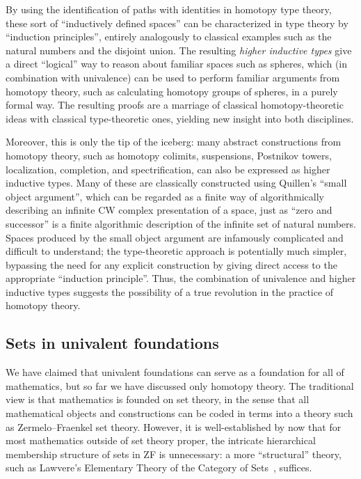 By using the identification of paths with identities in homotopy type theory, these sort of ``inductively defined spaces'' can be characterized in type theory by ``induction principles'', entirely analogously to classical examples such as the natural numbers and the disjoint union.
The resulting \emph{higher inductive types} give a direct ``logical'' way to reason about familiar spaces such as spheres, which (in combination with univalence) can be used to perform familiar arguments from homotopy theory, such as calculating homotopy groups of spheres, in a purely formal way.
The resulting proofs are a marriage of classical homotopy-theoretic ideas with classical type-theoretic ones, yielding new insight into both disciplines.

Moreover, this is only the tip of the iceberg: many abstract constructions from homotopy theory, such as homotopy colimits, suspensions, Postnikov towers, localization, completion, and spectrification, can also be expressed as higher inductive types.
Many of these are classically constructed using Quillen's ``small object argument'', which can be regarded as a finite way of algorithmically describing an infinite CW complex presentation of a space, just as ``zero and successor'' is a finite algorithmic description of the infinite set of natural numbers.
Spaces produced by the small object argument are infamously complicated and difficult to understand; the type-theoretic approach is potentially much simpler, bypassing the need for any explicit construction by giving direct access to the appropriate ``induction principle''.
Thus, the combination of univalence and higher inductive types suggests the possibility of a true revolution in the practice of homotopy theory.


\subsection*{Sets in univalent foundations}

We have claimed that univalent foundations can serve as a foundation for all of mathematics, but so far we have discussed only homotopy theory.
The traditional view is that mathematics is founded on set theory, in the sense that all mathematical objects and constructions can be coded in terms into a theory such as Zermelo--Fraenkel set theory.
However, it is well-established by now that for most mathematics outside of set theory proper, the intricate hierarchical membership structure of sets in ZF is unnecessary: a more ``structural'' theory, such as Lawvere's Elementary Theory of the Category of Sets~\cite{lawvere:etcs-long}, suffices.


